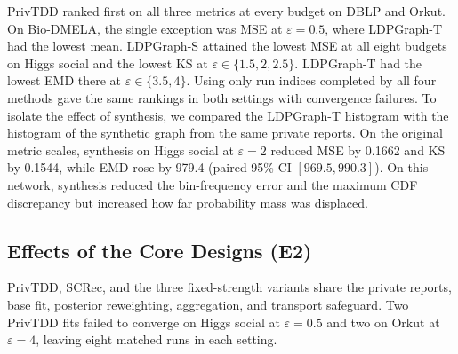 PrivTDD ranked first on all three metrics at every budget on DBLP and Orkut. On Bio-DMELA, the single exception was MSE at $\varepsilon=0.5$, where LDPGraph-T had the lowest mean.
LDPGraph-S attained the lowest MSE at all eight budgets on Higgs social and the lowest KS at $\varepsilon\in\{1.5,2,2.5\}$. LDPGraph-T had the lowest EMD there at $\varepsilon\in\{3.5,4\}$.
Using only run indices completed by all four methods gave the same rankings in both settings with convergence failures.
To isolate the effect of synthesis, we compared the LDPGraph-T histogram with the histogram of the synthetic graph from the same private reports.
On the original metric scales, synthesis on Higgs social at $\varepsilon=2$ reduced MSE by 0.1662 and KS by 0.1544, while EMD rose by 979.4 (paired 95\% CI $[969.5,990.3]$).
On this network, synthesis reduced the bin-frequency error and the maximum CDF discrepancy but increased how far probability mass was displaced.


\subsection{Effects of the Core Designs (E2)}\label{sec:gdd:en:ablation}
PrivTDD, SCRec, and the three fixed-strength variants share the private reports, base fit, posterior reweighting, aggregation, and transport safeguard.
Two PrivTDD fits failed to converge on Higgs social at $\varepsilon=0.5$ and two on Orkut at $\varepsilon=4$, leaving eight matched runs in each setting.




